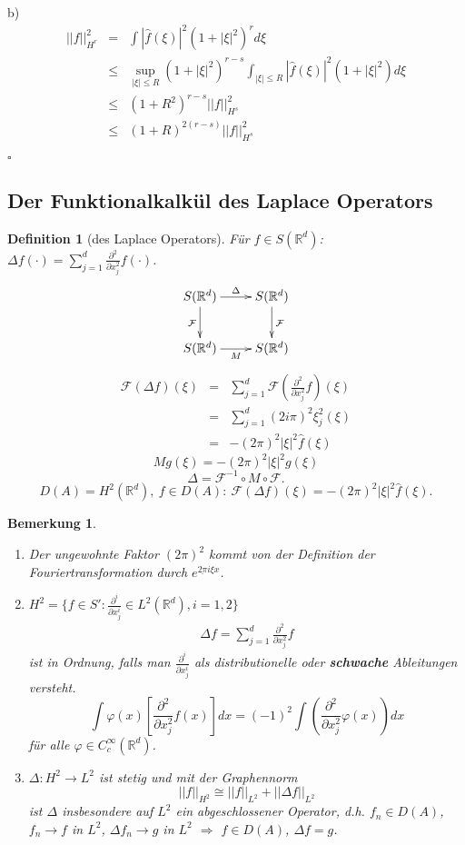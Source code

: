 \documentclass[12pt,a4paper,titlepage]{scrartcl}
\newtheorem{Definition}[Satz]{Definition}
\newtheorem{Bemerkung}[Satz]{Bemerkung}
\numberwithin{equation}{section}
\newcommand{\R}{\mathbb{R}} %
\newcommand{\f}{\hat{f}}
\newcommand{\F}{\mathcal{F}}
\newcommand{\m}{\cdot}
\newcommand{\qed}{\begin{flushright}
		$\square$
	\end{flushright}}
\begin{document}
	b) 
	\begin{eqnarray}
		||f||_{H^r}^2 &=& \int |\f(\xi)|^2(1+|\xi|^2)^rd\xi\nonumber\\
		&\leq& \sup_{|\xi|\leq R}(1+|\xi|^2)^{r-s}\int_{|\xi|\leq R}|\f(\xi)|^2(1+|\xi|^2)d\xi\nonumber\\
		&\leq& (1+R^2)^{r-s}||f||_{H^s}^2\nonumber\\
		&\leq& (1+R)^{2(r-s)}||f||_{H^s}^2\nonumber
	\end{eqnarray}
	\qed
	
	
	\subsection{Der Funktionalkalkül des Laplace Operators}
	
	\begin{Definition}[des Laplace Operators]
		Für $f\in S(\R^d)$: $\Delta f(\m)=\sum_{j = 1}^{d}\frac{\partial^2}{\partial x_j^2} f(\m)$. 
		$$\xymatrix{
			S(\R^d)\ar[r]^{\Delta}\ar[d]_{\F} & S(\R^d)\ar[d]^{\F}\\
			S(\R^d)\ar[r]_M & S(\R^d)
			}$$
		\begin{eqnarray}
			\F(\Delta f)(\xi) &=& \sum_{j = 1}^{d}\F(\frac{\partial^2}{\partial x_j^2}f)(\xi) \nonumber\\
			&=& \sum_{j = 1}^d (2i\pi)^2\xi_j^2 (\xi)\nonumber\\
			&=& -(2\pi)^2 |\xi|^2 \f(\xi)\nonumber
		\end{eqnarray}
		$$Mg(\xi) = -(2\pi)^2|\xi|^2 g(\xi)$$
		$$\boxed{\Delta= \F^{-1}\circ M\circ \F.}$$
		$$D(A) = H^2(\R^d),~ f\in D(A):~ \F(\Delta f)(\xi) = -(2\pi)^2|\xi|^2\f(\xi).$$
	\end{Definition}
	
	\begin{Bemerkung}
		~
		\begin{enumerate}
			\item[a)] Der ungewohnte Faktor $(2\pi)^2$ kommt von der Definition der Fouriertransformation durch $e^{\underline{2\pi}i\xi x}$.
			\item[b)] $H^2 = \{f\in S': \frac{\partial^i}{\partial x_j^i}\in L^2(\R^d), i=1,2 \}$
			\begin{eqnarray}
				\Delta f = \sum_{j = 1}^d \frac{\partial^2}{\partial x_j^2} f\nonumber
			\end{eqnarray}
			ist in Ordnung, falls man $\frac{\partial^i}{\partial x_j^i}$ als distributionelle oder \textbf{schwache} Ableitungen versteht. 
			$$\int \varphi(x)\left[\frac{\partial^2}{\partial x_j^2} f(x)\right]dx = (-1)^{2}\int\left(\frac{\partial^2}{\partial x_j^2} \varphi(x) \right)dx$$
			für alle $\varphi\in C_c^\infty(\R^d)$.
			\item[c)] $\Delta: H^2\rightarrow L^2$ ist stetig und mit der Graphennorm
			$$||f||_{H^2}\cong ||f||_{L^2} + ||\Delta f||_{L^2}$$
			ist $\Delta$ insbesondere auf $L^2$ ein abgeschlossener Operator, d.h. $f_n\in D(A)$, $f_n\rightarrow f$ in $L^2$, $\Delta f_n\rightarrow g$ in $L^2$ $\Rightarrow$ $f\in D(A)$, $\Delta f = g$.
		\end{enumerate}
	\end{Bemerkung}
	
\end{document}
